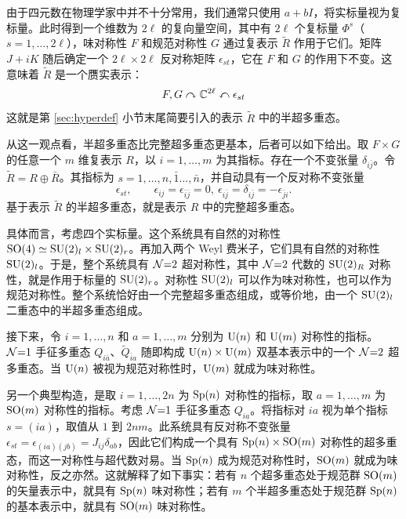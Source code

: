 由于四元数在物理学家中并不十分常用，我们通常只使用 $a+bI$，将实标量视为复标量。此时得到一个维数为 $2\ell$ 的复向量空间，其中有 $2\ell$ 个复标量 $\Phi^s$（$s=1,\ldots,2\ell$），味对称性 $F$ 和规范对称性 $G$ 通过复表示 $\tilde R$ 作用于它们。矩阵 $J+iK$ 随后确定一个 $2\ell\times2\ell$ 反对称矩阵 $\epsilon_{st}$，它在 $F$ 和 $G$ 的作用下不变。这意味着 $\tilde R$ 是一个赝实表示：
\begin{equation}
F,G\curvearrowright\mathbb{C}^{2\ell}\curvearrowleft\epsilon_{st}
\end{equation}
这就是第 \ref{sec:hyperdef} 小节末尾简要引入的表示 $\tilde R$ 中的半超多重态。

从这一观点看，半超多重态比完整超多重态更基本，后者可以如下给出。取 $F\times G$ 的任意一个 $m$ 维复表示 $R$，以 $i=1,\ldots,m$ 为其指标。存在一个不变张量 $\delta_{i\bar j}$。令 $\tilde R=R\oplus\bar R$。其指标为 $s=1,\ldots,n,\bar1\ldots,\bar n$，并自动具有一个反对称不变张量
\begin{equation}
\epsilon_{st},\qquad\epsilon_{ij}=\epsilon_{\bar i\bar j}=0,\ \epsilon_{i\bar j}=\delta_{i\bar j}=-\epsilon_{\bar ji}.
\end{equation}
基于表示 $\tilde R$ 的半超多重态，就是表示 $R$ 中的完整超多重态。


具体而言，考虑四个实标量。这个系统具有自然的对称性 $\mathop{\mathrm{SO}}(4)\simeq\mathop{\mathrm{SU}}(2)_l\times\mathop{\mathrm{SU}}(2)_r$。再加入两个 Weyl 费米子，它们具有自然的对称性 $\mathop{\mathrm{SU}}(2)_l$。于是，整个系统具有 $\mathcal{N}{=}2$ 超对称性，其中 $\mathcal{N}{=}2$ 代数的 $\mathop{\mathrm{SU}}(2)_R$ 对称性，就是作用于标量的 $\mathop{\mathrm{SU}}(2)_r$。对称性 $\mathop{\mathrm{SU}}(2)_l$ 可以作为味对称性，也可以作为规范对称性。整个系统恰好由一个完整超多重态组成，或等价地，由一个 $\mathop{\mathrm{SU}}(2)_l$ 二重态中的半超多重态组成。

接下来，令 $i=1,\ldots,n$ 和 $a=1,\ldots,m$ 分别为 ${\mathrm{U}}(n)$ 和 ${\mathrm{U}}(m)$ 对称性的指标。$\mathcal{N}{=}1$ 手征多重态 $Q_{i\bar a}$、$\tilde Q_{\bar ia}$ 随即构成 ${\mathrm{U}}(n)\times{\mathrm{U}}(m)$ 双基本表示中的一个 $\mathcal{N}{=}2$ 超多重态。当 ${\mathrm{U}}(n)$ 被视为规范对称性时，${\mathrm{U}}(m)$ 就成为味对称性。

另一个典型构造，是取 $i=1,\ldots,2n$ 为 $\mathop{\mathrm{Sp}}(n)$ 对称性的指标，取 $a=1,\ldots,m$ 为 $\mathop{\mathrm{SO}}(m)$ 对称性的指标。考虑 $\mathcal{N}{=}1$ 手征多重态 $Q_{ia}$。将指标对 $ia$ 视为单个指标 $s=(ia)$，取值从 $1$ 到 $2nm$。此系统具有反对称不变张量 $\epsilon_{st}=\epsilon_{(ia)(jb)}=J_{ij}\delta_{ab}$，因此它们构成一个具有 $\mathop{\mathrm{Sp}}(n)\times\mathop{\mathrm{SO}}(m)$ 对称性的超多重态，而这一对称性与超代数对易。当 $\mathop{\mathrm{Sp}}(n)$ 成为规范对称性时，$\mathop{\mathrm{SO}}(m)$ 就成为味对称性，反之亦然。这就解释了如下事实：若有 $n$ 个超多重态处于规范群 $\mathop{\mathrm{SO}}(m)$ 的矢量表示中，就具有 $\mathop{\mathrm{Sp}}(n)$ 味对称性；若有 $m$ 个半超多重态处于规范群 $\mathop{\mathrm{Sp}}(n)$ 的基本表示中，就具有 $\mathop{\mathrm{SO}}(m)$ 味对称性。

